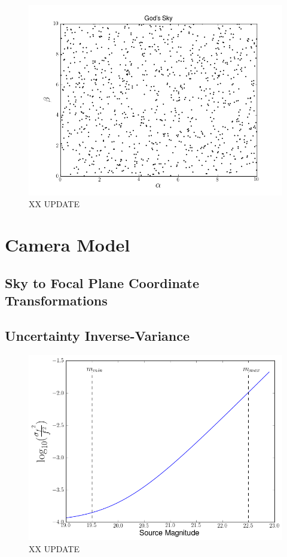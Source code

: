 \documentclass[12pt,a4paper,twoside]{article}
\begin{document}
\begin{figure}[ht]
\begin{center}
\includegraphics[width=\textwidth]{gods_sky.png}
\end{center}
\caption{XX UPDATE \label{fig:gods_sky}}
\end{figure}

\section{Camera Model}

\subsection{Sky to Focal Plane Coordinate Transformations}

\subsection{Uncertainty Inverse-Variance}
\begin{figure}[ht]
\begin{center}
\includegraphics[width=\textwidth]{flux_uncertainty_variance.png}
\end{center}
\caption{XX UPDATE \label{fig:flux_uncertainty}}
\end{figure}
\end{document}

